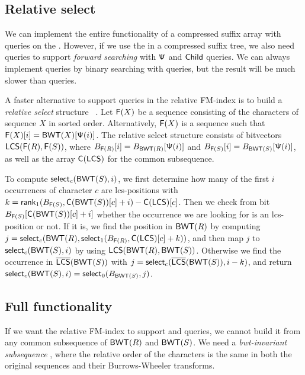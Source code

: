 \subsection{Relative select}

We can implement the entire functionality of a compressed suffix array with
\rank{} queries on the \BWT. However, if we use the \CSA{} in a compressed
suffix tree, we also need \select{} queries to support \emph{forward
searching} with $\mathsf{\Psi}$ and $\mathsf{Child}$ queries. We can always implement
\select{} queries by binary searching with \rank{} queries, but the result
will be much slower than \rank{} queries.

A faster alternative to support \select{} queries in the relative FM-index
is to build a \emph{relative select} structure \rselect{}~\cite{Boucher2015}.
Let $\mathsf{F}(X)$ be a sequence consisting of the characters of sequence $X$ in
sorted order. Alternatively, $\mathsf{F}(X)$ is a sequence such that $\mathsf{F}(X)[i] =
\mathsf{BWT}(X)[\mathsf{\Psi}(i)]$. The relative select structure consists of bitvectors
$\mathsf{LCS}(\mathsf{F}(R), \mathsf{F}(S))$, where $B_{\mathsf{F}(R)}[i] = B_{\mathsf{BWT}(R)}[\mathsf{\Psi}(i)]$ and
$B_{\mathsf{F}(S)}[i] = B_{\mathsf{BWT}(S)}[\mathsf{\Psi}(i)]$, as well as the \C{} array
$\mathsf{C}(\mathsf{LCS})$ for the common subsequence.

To compute $\mathsf{select}_{c}(\mathsf{BWT}(S), i)$, we first determine how many of
the first $i$ occurrences of character $c$ are lcs-positions with $k =
\mathsf{rank}_{1}(B_{\mathsf{F}(S)}, \mathsf{C}(\mathsf{BWT}(S))[c] + i) - \mathsf{C}(\mathsf{LCS})[c]$. Then we check
from bit $B_{\mathsf{F}(S)}[\mathsf{C}(\mathsf{BWT}(S))[c] + i]$ whether the occurrence we are
looking for is an lcs-position or not. If it is,
we find the position in $\mathsf{BWT}(R)$ by computing $j = \mathsf{select}_{c}(\mathsf{BWT}(R),
\mathsf{select}_{1}(B_{\mathsf{F}(R)}, \mathsf{C}(\mathsf{LCS})[c] + k))$, and then map $j$ to
$\mathsf{select}_{c}(\mathsf{BWT}(S), i)$ by using $\mathsf{LCS}(\mathsf{BWT}(R), \mathsf{BWT}(S))$. Otherwise we
find the occurrence in $\overline{ \mathsf{LCS} }(\mathsf{BWT}(S))$ with $j = \mathsf{select}_{c}(\overline{ \mathsf{LCS} }(\mathsf{BWT}(S)),
i-k)$, and return $\mathsf{select}_{c}(\mathsf{BWT}(S), i) = \mathsf{select}_{0}(B_{\mathsf{BWT}(S)}, j)$.

\subsection{Full functionality}

If we want the relative FM-index to support \locate{} and \extract{} queries,
we cannot build it from any common subsequence of $\mathsf{BWT}(R)$ and $\mathsf{BWT}(S)$.
We need a \emph{bwt-invariant subsequence} \cite{Belazzougui2014}, where the
relative order of the characters is the same in both the original sequences
and their Burrows-Wheeler transforms.

